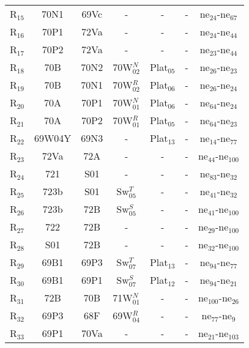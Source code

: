 \begin{table}[H]
{{\begin{tabular}{ c c c c c c c }
                    R$_{15}$ & 70N1 & 69Vc & - & - & - & ne$_{24}$-ne$_{67}$\\
                    R$_{16}$ & 70P1 & 72Va & - & - & - & ne$_{24}$-ne$_{44}$\\
                    R$_{17}$ & 70P2 & 72Va & - & - & - & ne$_{23}$-ne$_{44}$\\
                    R$_{18}$ & 70B & 70N2 & 70W$_{02}^{N}$ & Plat$_{05}$ & - & ne$_{26}$-ne$_{23}$\\
                    R$_{19}$ & 70B & 70N1 & 70W$_{02}^{R}$ & Plat$_{06}$ & - & ne$_{26}$-ne$_{24}$\\
                    R$_{20}$ & 70A & 70P1 & 70W$_{01}^{N}$ & Plat$_{06}$ & - & ne$_{64}$-ne$_{24}$\\
                    R$_{21}$ & 70A & 70P2 & 70W$_{01}^{R}$ & Plat$_{05}$ & - & ne$_{64}$-ne$_{23}$\\
                    R$_{22}$ & 69W04Y & 69N3 & - & Plat$_{13}$ & - & ne$_{14}$-ne$_{77}$\\
                    R$_{23}$ & 72Va & 72A & - & - & - & ne$_{44}$-ne$_{100}$\\
                    R$_{24}$ & 721 & S01 & - & - & - & ne$_{83}$-ne$_{32}$\\
                    R$_{25}$ & 723b & S01 & Sw$_{05}^{T}$ & - & - & ne$_{41}$-ne$_{32}$\\
                    R$_{26}$ & 723b & 72B & Sw$_{05}^{S}$ & - & - & ne$_{41}$-ne$_{100}$\\
                    R$_{27}$ & 722 & 72B & - & - & - & ne$_{29}$-ne$_{100}$\\
                    R$_{28}$ & S01 & 72B & - & - & - & ne$_{32}$-ne$_{100}$\\
                    R$_{29}$ & 69B1 & 69P3 & Sw$_{07}^{T}$ & Plat$_{13}$ & - & ne$_{94}$-ne$_{77}$\\
                    R$_{30}$ & 69B1 & 69P1 & Sw$_{07}^{S}$ & Plat$_{12}$ & - & ne$_{94}$-ne$_{21}$\\
                    R$_{31}$ & 72B & 70B & 71W$_{01}^{N}$ & - & - & ne$_{100}$-ne$_{26}$\\
                    R$_{32}$ & 69P3 & 68F & 69W$_{04}^{R}$ & - & - & ne$_{77}$-ne$_{9}$\\
                    R$_{33}$ & 69P1 & 70Va & - & - & - & ne$_{21}$-ne$_{103}$\\
                \hline
            \end{tabular}
        }
     }
    \end{table}
    
    \lipsum[1]